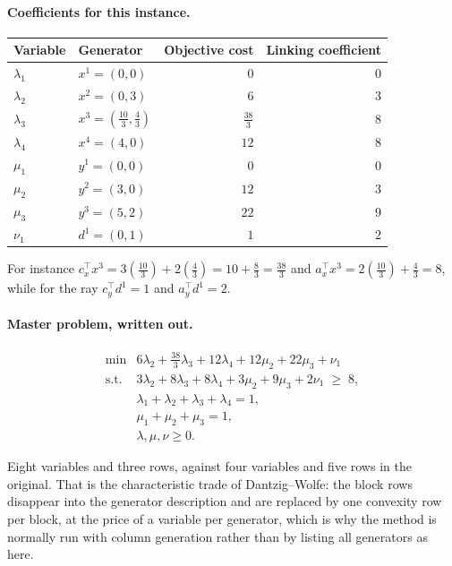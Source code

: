 \documentclass[11pt]{article}
\DeclareMathOperator*{\minimize}{min}
\theoremstyle{definition}
\theoremstyle{plain}
\begin{document}
\paragraph{Coefficients for this instance.}

\begin{center}
\begin{tabular}{@{}llrr@{}}
\toprule
Variable & Generator & Objective cost & Linking coefficient \\
\midrule
$\lambda_1$ & $x^1 = (0,0)$ & $0$ & $0$ \\
$\lambda_2$ & $x^2 = (0,3)$ & $6$ & $3$ \\
$\lambda_3$ & $x^3 = (\tfrac{10}{3},\tfrac43)$
            & $\tfrac{38}{3}$ & $8$ \\
$\lambda_4$ & $x^4 = (4,0)$ & $12$ & $8$ \\
$\mu_1$     & $y^1 = (0,0)$ & $0$ & $0$ \\
$\mu_2$     & $y^2 = (3,0)$ & $12$ & $3$ \\
$\mu_3$     & $y^3 = (5,2)$ & $22$ & $9$ \\
$\nu_1$     & $d^1 = (0,1)$ & $1$ & $2$ \\
\bottomrule
\end{tabular}
\end{center}

For instance $c_x^{\!\top} x^3 = 3(\tfrac{10}{3}) + 2(\tfrac43)
= 10 + \tfrac83 = \tfrac{38}{3}$ and
$a_x^{\!\top} x^3 = 2(\tfrac{10}{3}) + \tfrac43 = 8$, while for the ray
$c_y^{\!\top} d^1 = 1$ and $a_y^{\!\top} d^1 = 2$.

\paragraph{Master problem, written out.}
\[
\begin{array}{ll}
  \minimize &
    6\lambda_2 + \tfrac{38}{3}\lambda_3 + 12\lambda_4
    + 12\mu_2 + 22\mu_3 + \nu_1 \\[4pt]
  \text{s.t.} &
    3\lambda_2 + 8\lambda_3 + 8\lambda_4
    + 3\mu_2 + 9\mu_3 + 2\nu_1 \;\ge\; 8, \\[2pt]
  & \lambda_1 + \lambda_2 + \lambda_3 + \lambda_4 = 1, \\[2pt]
  & \mu_1 + \mu_2 + \mu_3 = 1, \\[2pt]
  & \lambda, \mu, \nu \ge 0 .
\end{array}
\]

Eight variables and three rows, against four variables and five rows in
the original. That is the characteristic trade of Dantzig--Wolfe: the
block rows disappear into the generator description and are replaced by
one convexity row per block, at the price of a variable per generator,
which is why the method is normally run with column generation rather
than by listing all generators as here.
\end{document}
